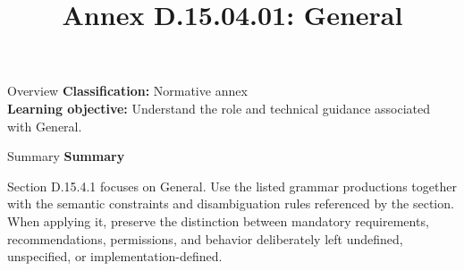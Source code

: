 \documentclass[10pt,letterpaper]{article}
\title{Annex D.15.04.01: General}
\author{}
\date{}
\begin{document}
\maketitle
\begin{CornellOverviewBox}{Overview}
\textbf{Classification:} Normative annex\\[2pt]
\textbf{Learning objective:} Understand the role and technical guidance associated with General.
\end{CornellOverviewBox}\begin{CornellSummaryBox}{Summary}
{\sffamily\bfseries\color{Accent} Summary}\par\vspace{3pt}Section D.15.4.1 focuses on General. Use the listed grammar productions together with the semantic constraints and disambiguation rules referenced by the section. When applying it, preserve the distinction between mandatory requirements, recommendations, permissions, and behavior deliberately left undefined, unspecified, or implementation-defined.
\end{CornellSummaryBox}
\end{document}
